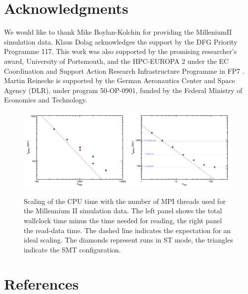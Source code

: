 \documentclass[1p,times]{elsarticle}
\begin{document}
\section*{Acknowledgments}
We would like to thank Mike Boylan-Kolchin for providing the MilleniumII simulation data. 
Klaus Dolag acknowledges the support 
by the DFG Priority Programme 117. This work was also supported by the promising 
researcher's award, University of Portsmouth, and the HPC-EUROPA 2 
under the EC Coordination and Support Action Research Infrastructure Programme in FP7 
. Martin Reinecke is supported by the
German Aeronautics Center and Space Agency (DLR), under program 50-OP-0901, funded by the
Federal Ministry of Economics and Technology.


\begin{figure}
\begin{center}
\includegraphics[width=0.49\textwidth]{t_cpu.pdf}
\includegraphics[width=0.49\textwidth]{t_read.pdf}
\end{center}
\caption{Scaling of the CPU time with the number of MPI threads used 
for the
Millennium II simulation data. 
The left panel shows the total wallclock time minus the time needed for 
reading, the right panel the read-data time. 
The dashed line indicates the expectation for an ideal scaling.  
The diamonds represent runs in ST mode, 
the triangles indicate the SMT configuration.
}\label{cpu_scaling}
\end{figure}

\section*{References}
\end{document}

